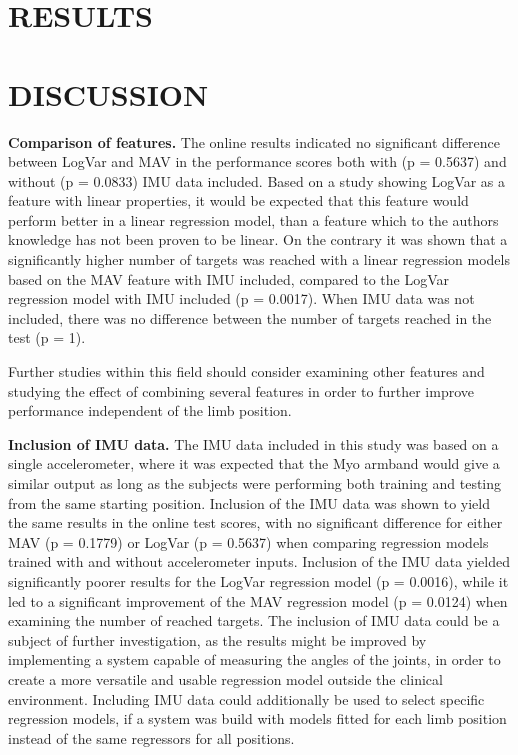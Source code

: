 \documentclass[a4paper, 10pt, conference]{ieeeconf}      %
\begin{document}
\section{RESULTS}%
	
%		
	
\section{DISCUSSION}%
	
%		
\textbf{Comparison of features.}
The online results indicated no significant difference between LogVar and MAV in the performance scores both with (p = 0.5637) and without (p = 0.0833) IMU data included. Based on a study \cite{hahne2014} showing LogVar as a feature with linear properties, it would be expected that this feature would perform better in a linear regression model, than a feature which to the authors knowledge has not been proven to be linear. On the contrary it was shown that a significantly higher number of targets was reached with a linear regression models based on the MAV feature with IMU included, compared to the LogVar regression model with IMU included (p = 0.0017). When IMU data was not included, there was no difference between the number of targets reached in the test (p = 1).

Further studies within this field should consider examining other features and studying the effect of combining several features in order to further improve performance independent of the limb position.

\textbf{Inclusion of IMU data.}
The IMU data included in this study was based on a single accelerometer, where it was expected that the Myo armband would give a similar output as long as the subjects were performing both training and testing from the same starting position. Inclusion of the IMU data was shown to yield the same results in the online test scores, with no significant difference for either MAV (p = 0.1779) or LogVar (p = 0.5637) when comparing regression models trained with and without accelerometer inputs. Inclusion of the IMU data yielded significantly poorer results for the LogVar regression model (p = 0.0016), while it led to a significant improvement of the MAV regression model (p = 0.0124) when examining the number of reached targets. The inclusion of IMU data could be a subject of further investigation, as the results might be improved by implementing a system capable of measuring the angles of the joints, in order to create a more versatile and usable regression model outside the clinical environment. Including IMU data could additionally be used to select specific regression models, if a system was build with models fitted for each limb position instead of the same regressors for all positions. 
\end{document}
